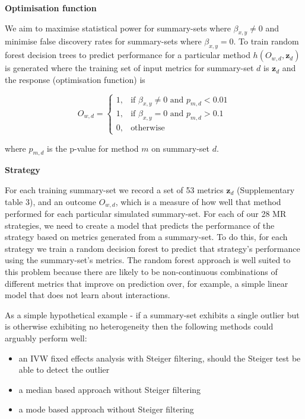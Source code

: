 \documentclass[]{article}
\providecommand{\tightlist}{%
  \setlength{\itemsep}{0pt}\setlength{\parskip}{0pt}}
\begin{document}
\textbf{Optimisation function}

We aim to maximise statistical power for summary-sets where
\(\beta_{x,y} \neq 0\) and minimise false discovery rates for
summary-sets where \(\beta_{x,y} = 0\). To train random forest decision
trees to predict performance for a particular method
\(h(O_{w,d}, \textbf{z}_{d})\) is generated where the training set of
input metrics for summary-set \(d\) is \(\textbf{z}_{d}\) and the
response (optimisation function) is

\[
    O_{w,d} = 
\begin{cases}
    1,   & \text{if } \beta_{x,y} \neq 0 \text{ and } p_{m,d} < 0.01\\
    1,   & \text{if } \beta_{x,y} = 0 \text{ and } p_{m,d} > 0.1 \\
    0,   & \text{otherwise}
\end{cases}
\]

where \(p_{m,d}\) is the p-value for method \(m\) on summary-set \(d\).

\textbf{Strategy}

For each training summary-set we record a set of 53 metrics
\(\textbf{z}_{d}\) (Supplementary table 3), and an outcome \(O_{w,d}\),
which is a measure of how well that method performed for each particular
simulated summary-set. For each of our 28 MR strategies, we need to
create a model that predicts the performance of the strategy based on
metrics generated from a summary-set. To do this, for each strategy we
train a random decision forest to predict that strategy's performance
using the summary-set's metrics. The random forest approach is well
suited to this problem because there are likely to be non-continuous
combinations of different metrics that improve on prediction over, for
example, a simple linear model that does not learn about interactions.

As a simple hypothetical example - if a summary-set exhibits a single
outlier but is otherwise exhibiting no heterogeneity then the following
methods could arguably perform well:

\begin{itemize}
\tightlist
\item
  an IVW fixed effects analysis with Steiger filtering, should the
  Steiger test be able to detect the outlier
\item
  a median based approach without Steiger filtering
\item
  a mode based approach without Steiger filtering
\end{itemize}
\end{document}
